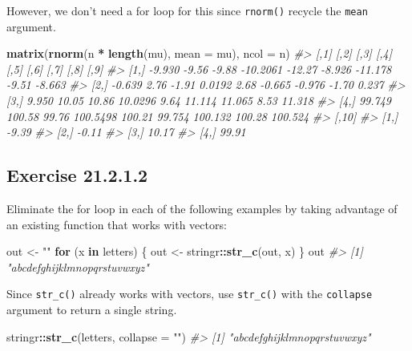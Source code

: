 \documentclass[]{book}
\newenvironment{Shaded}{\begin{snugshade}}{\end{snugshade}}
\newcommand{\CommentTok}[1]{\textcolor[rgb]{0.56,0.35,0.01}{\textit{#1}}}
\newcommand{\ControlFlowTok}[1]{\textcolor[rgb]{0.13,0.29,0.53}{\textbf{#1}}}
\newcommand{\DataTypeTok}[1]{\textcolor[rgb]{0.13,0.29,0.53}{#1}}
\newcommand{\KeywordTok}[1]{\textcolor[rgb]{0.13,0.29,0.53}{\textbf{#1}}}
\newcommand{\NormalTok}[1]{#1}
\newcommand{\OperatorTok}[1]{\textcolor[rgb]{0.81,0.36,0.00}{\textbf{#1}}}
\newcommand{\StringTok}[1]{\textcolor[rgb]{0.31,0.60,0.02}{#1}}
\theoremstyle{plain}
\theoremstyle{remark}
\begin{document}
However, we don't need a for loop for this since \texttt{rnorm()} recycle the \texttt{mean} argument.

\begin{Shaded}
\begin{Highlighting}[]
\KeywordTok{matrix}\NormalTok{(}\KeywordTok{rnorm}\NormalTok{(n }\OperatorTok{*}\StringTok{ }\KeywordTok{length}\NormalTok{(mu), }\DataTypeTok{mean =}\NormalTok{ mu), }\DataTypeTok{ncol =}\NormalTok{ n)}
\CommentTok{#>        [,1]   [,2]  [,3]     [,4]   [,5]   [,6]    [,7]   [,8]    [,9]}
\CommentTok{#> [1,] -9.930  -9.56 -9.88 -10.2061 -12.27 -8.926 -11.178  -9.51  -8.663}
\CommentTok{#> [2,] -0.639   2.76 -1.91   0.0192   2.68 -0.665  -0.976  -1.70   0.237}
\CommentTok{#> [3,]  9.950  10.05 10.86  10.0296   9.64 11.114  11.065   8.53  11.318}
\CommentTok{#> [4,] 99.749 100.58 99.76 100.5498 100.21 99.754 100.132 100.28 100.524}
\CommentTok{#>      [,10]}
\CommentTok{#> [1,] -9.39}
\CommentTok{#> [2,] -0.11}
\CommentTok{#> [3,] 10.17}
\CommentTok{#> [4,] 99.91}
\end{Highlighting}
\end{Shaded}

\hypertarget{exercise-21.2.1.2}{%
\subsection*{\texorpdfstring{Exercise {21.2.1.2}}{Exercise 21.2.1.2}}\label{exercise-21.2.1.2}}

Eliminate the for loop in each of the following examples by taking advantage of an existing function that works with vectors:

\begin{Shaded}
\begin{Highlighting}[]
\NormalTok{out <-}\StringTok{ ""}
\ControlFlowTok{for}\NormalTok{ (x }\ControlFlowTok{in}\NormalTok{ letters) \{}
\NormalTok{  out <-}\StringTok{ }\NormalTok{stringr}\OperatorTok{::}\KeywordTok{str_c}\NormalTok{(out, x)}
\NormalTok{\}}
\NormalTok{out}
\CommentTok{#> [1] "abcdefghijklmnopqrstuvwxyz"}
\end{Highlighting}
\end{Shaded}

Since \texttt{str\_c()} already works with vectors, use \texttt{str\_c()} with the \texttt{collapse} argument to return a single string.

\begin{Shaded}
\begin{Highlighting}[]
\NormalTok{stringr}\OperatorTok{::}\KeywordTok{str_c}\NormalTok{(letters, }\DataTypeTok{collapse =} \StringTok{""}\NormalTok{)}
\CommentTok{#> [1] "abcdefghijklmnopqrstuvwxyz"}
\end{Highlighting}
\end{Shaded}
\end{document}
